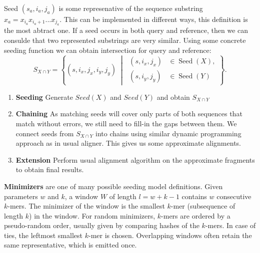 Seed $(s_a, i_a, j_a)$ is some represenative of the sequence substring $x_a = x_{i_a}x_{i_a+1}...x_{j_a}$. This can be implemented in different ways, this definition is the most abtract one.
If a seed occurs in both query and reference, then we can consulde that two represented substrings are very similar.
Using some concrete seeding function we can obtain intersection for query and reference:
\begin{equation}
  S_{X\cap Y}=\left\{
    (s,i_x,j_x,i_y,j_y)\;\middle|\;
    \begin{aligned}
      (s,i_x,j_x)&\in\operatorname{Seed}(X),\\
      (s,i_y,j_y)&\in\operatorname{Seed}(Y)
    \end{aligned}
  \right\}.
\label{eq:matching-seeds}
\end{equation}

\begin{enumerate}
  \item \textbf{Seeding} Generate $Seed(X)$ and $Seed(Y)$ and obtain $S_{X \cap Y}$
  \item \textbf{Chaining} As matching seeds will cover only parts of both sequences that match without errors, we still need to fill-in the gaps between them. We connect seeds from $S_{X \cap Y}$ into chains using similar dynamic programming approach as in usual aligner. This gives us some approximate alignments.
  \item \textbf{Extension} Perform usual alignment algorithm on the approximate fragments to obtain final results.
\end{enumerate}


\textbf{Minimizers} are one of many possible seeding model definitions. Given parameters $w$ and $k$, a window $W$ of length $l = w + k - 1$ contains
$w$ consecutive $k$-mers. The minimizer of the window is the smallest $k$-mer (subsequence of length $k$) in the window.
For random minimizers, $k$-mers are ordered by a pseudo-random order, usually given by
comparing hashes of the $k$-mers. In case of ties, the leftmost smallest $k$-mer is chosen. \cite{roberts_minimizers_2004}
Overlapping windows often retain the same representative, which is emitted once.

